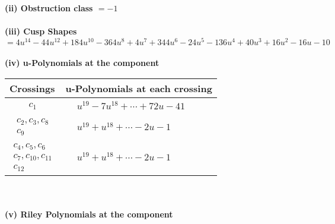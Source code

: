 \documentclass[1p]{elsarticle_modified}
\theoremstyle{definition}
\begin{document}
\flushleft \textbf{(ii) Obstruction class $= -1$}\\~\\
\flushleft \textbf{(iii) Cusp Shapes $= 4 u^{14}-44 u^{12}+184 u^{10}-364 u^8+4 u^7+344 u^6-24 u^5-136 u^4+40 u^3+16 u^2-16 u-10$}\\~\\
\newpage\renewcommand{\arraystretch}{1}
\flushleft \textbf{(iv) u-Polynomials at the component}\newline \\
\begin{tabular}{m{50pt}|m{274pt}}
Crossings & \hspace{64pt}u-Polynomials at each crossing \\
\hline $$\begin{aligned}c_{1}\end{aligned}$$&$\begin{aligned}
&u^{19}-7 u^{18}+\cdots+72 u-41
\end{aligned}$\\
\hline $$\begin{aligned}c_{2},c_{3},c_{8}\\c_{9}\end{aligned}$$&$\begin{aligned}
&u^{19}+u^{18}+\cdots-2 u-1
\end{aligned}$\\
\hline $$\begin{aligned}c_{4},c_{5},c_{6}\\c_{7},c_{10},c_{11}\\c_{12}\end{aligned}$$&$\begin{aligned}
&u^{19}+u^{18}+\cdots-2 u-1
\end{aligned}$\\
\hline
\end{tabular}\\~\\
\newpage\renewcommand{\arraystretch}{1}
\flushleft \textbf{(v) Riley Polynomials at the component}\newline \\
\end{document}
